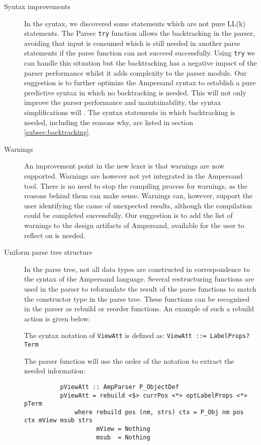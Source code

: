 \begin{description}
  \item[Syntax improvements]
    In the syntax, we discovered some statements which are not pure LL(k) statements.
    The Parsec \texttt{try} function allows the backtracking in the parser, avoiding that input is consumed which is still needed in another parse statements if the parse function can not succeed successfully.
    Using \texttt{try} we can handle this situation but the backtracking has a negative impact of the parser performance whilst it adds complexity to the parser module. 
    Our suggestion is to further optimize the Ampersand syntax to establish a pure predictive syntax in which no backtracking is needed.
    This will not only improve the parser performance and maintainability, the syntax simplifications will .
    The syntax statements in which backtracking is needed, including the reasons why, are listed in section \autoref{subsec:backtracking}.

  \item[Warnings]
    An improvement point in the new lexer is that warnings are now supported. 
    Warnings are however not yet integrated in the Ampersand tool.
    There is no need to stop the compiling process for warnings, as the reasons behind them can make sense.
    Warnings can, however, support the user identifying the cause of unexpected results, although the compilation could be completed successfully.
    Our suggestion is to add the list of warnings to the design artifacts of Ampersand, available for the user to reflect on is needed.

  \item[Uniform parse tree structure]
  
   In the parse tree, not all data types are constructed in correspondence to the syntax of the Ampersand language.
   Several restructuring functions are used in the parser to reformulate the result of the parse functions to match the constructor type in the parse tree.
   These functions can be recognized in the parser as rebuild or reorder functions.
   An example of such a rebuild action is given below:

   The syntax notation of \texttt{ViewAtt} is defined as: \texttt{ViewAtt ::= LabelProps? Term}
   
   The parser function will use the order of the notation to extract the needed information:

   \begin{verbatim}
          pViewAtt :: AmpParser P_ObjectDef
          pViewAtt = rebuild <$> currPos <*> optLabelProps <*> pTerm
              where rebuild pos (nm, strs) ctx = P_Obj nm pos ctx mView msub strs
                    mView = Nothing
                    msub  = Nothing
    \end{verbatim}
 

\end{description}
